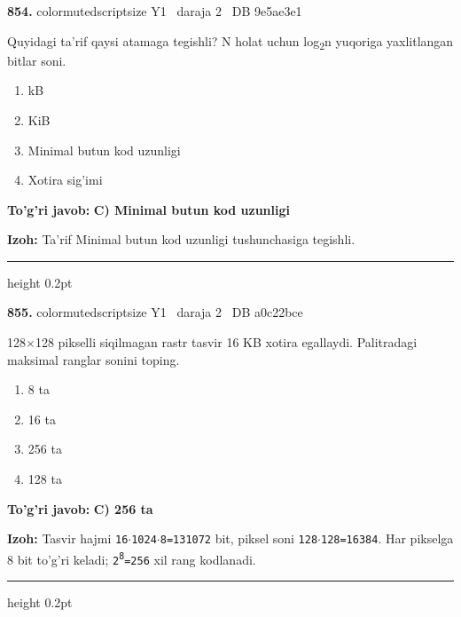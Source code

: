 \documentclass[10pt,a4paper,oneside]{article}
\begin{document}
\noindent\textbf{\color{ink}854.}  {color{muted}scriptsize Y1 \textbullet\ daraja 2 \textbullet\ DB 9e5ae3e1}
\par
Quyidagi ta'rif qaysi atamaga tegishli? N holat uchun log\textsubscript{2}n yuqoriga yaxlitlangan bitlar soni.
\begin{enumerate}[label=\Alph*),leftmargin=9mm]
\item kB
\item KiB
\item Minimal butun kod uzunligi
\item Xotira sig'imi
\end{enumerate}
\begin{tcolorbox}[enhanced,breakable,colback=teal!4,colframe=teal!50!black,boxrule=0.5pt,arc=1.1mm,left=3mm,right=3mm,top=1.7mm,bottom=1.7mm,before skip=2mm,after skip=2mm]
\textbf{\color{teal}To'g'ri javob:} \textbf{C) Minimal butun kod uzunligi}
\par\smallskip
\textbf{Izoh:} Ta'rif Minimal butun kod uzunligi tushunchasiga tegishli.
\end{tcolorbox}
\vspace{2mm}\hrule height 0.2pt \vspace{3mm}

\noindent\textbf{\color{ink}855.}  {color{muted}scriptsize Y1 \textbullet\ daraja 2 \textbullet\ DB a0c22bce}
\par
128\ensuremath{\times}128 pikselli siqilmagan rastr tasvir 16 KB xotira egallaydi. Palitradagi maksimal ranglar sonini toping.
\begin{enumerate}[label=\Alph*),leftmargin=9mm]
\item 8 ta
\item 16 ta
\item 256 ta
\item 128 ta
\end{enumerate}
\begin{tcolorbox}[enhanced,breakable,colback=teal!4,colframe=teal!50!black,boxrule=0.5pt,arc=1.1mm,left=3mm,right=3mm,top=1.7mm,bottom=1.7mm,before skip=2mm,after skip=2mm]
\textbf{\color{teal}To'g'ri javob:} \textbf{C) 256 ta}
\par\smallskip
\textbf{Izoh:} Tasvir hajmi \texttt{16\ensuremath{\cdot}1024\ensuremath{\cdot}8=131072} bit, piksel soni \texttt{128\ensuremath{\cdot}128=16384}. Har pikselga 8 bit to'g'ri keladi; \texttt{2\textsuperscript{8}=256} xil rang kodlanadi.
\end{tcolorbox}
\vspace{2mm}\hrule height 0.2pt \vspace{3mm}
\end{document}
